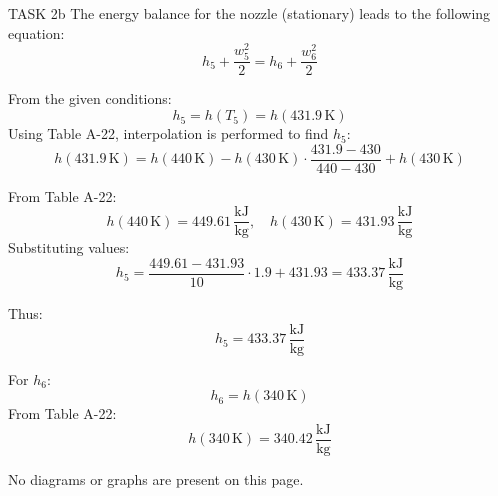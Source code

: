 TASK 2b  
The energy balance for the nozzle (stationary) leads to the following equation:  
\[
h_5 + \frac{w_5^2}{2} = h_6 + \frac{w_6^2}{2}
\]

From the given conditions:  
\[
h_5 = h(T_5) = h(431.9 \, \text{K})
\]  
Using Table A-22, interpolation is performed to find \( h_5 \):  
\[
h(431.9 \, \text{K}) = h(440 \, \text{K}) - h(430 \, \text{K}) \cdot \frac{431.9 - 430}{440 - 430} + h(430 \, \text{K})
\]  

From Table A-22:  
\[
h(440 \, \text{K}) = 449.61 \, \frac{\text{kJ}}{\text{kg}}, \quad h(430 \, \text{K}) = 431.93 \, \frac{\text{kJ}}{\text{kg}}
\]  
Substituting values:  
\[
h_5 = \frac{449.61 - 431.93}{10} \cdot 1.9 + 431.93 = 433.37 \, \frac{\text{kJ}}{\text{kg}}
\]  

Thus:  
\[
h_5 = 433.37 \, \frac{\text{kJ}}{\text{kg}}
\]

For \( h_6 \):  
\[
h_6 = h(340 \, \text{K})
\]  
From Table A-22:  
\[
h(340 \, \text{K}) = 340.42 \, \frac{\text{kJ}}{\text{kg}}
\]  

No diagrams or graphs are present on this page.